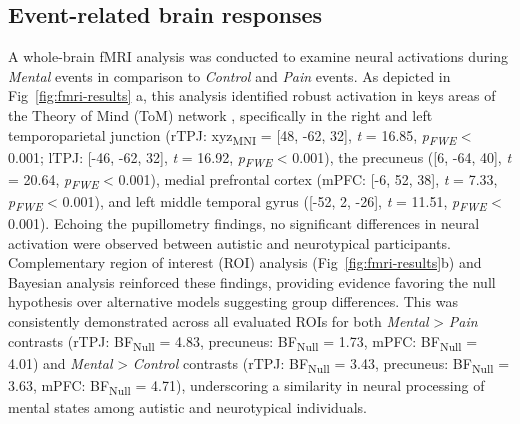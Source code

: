 \subsection{Event-related brain responses}
A whole-brain fMRI analysis was conducted to examine neural activations during \textit{Mental} events in comparison to \textit{Control} and \textit{Pain} events. As depicted in Fig~\ref{fig:fmri-results} a, this analysis identified robust activation in keys areas of the Theory of Mind (ToM) network \citep{schurz2014}, specifically in the right and left temporoparietal junction (rTPJ: xyz\textsubscript{MNI} = [48, -62, 32], \textit{t} = 16.85, \textit{p\textsubscript{FWE}} < 0.001; lTPJ: [-46, -62, 32], \textit{t} = 16.92, \textit{p\textsubscript{FWE}} < 0.001), the precuneus ([6, -64, 40], \textit{t} = 20.64, \textit{p\textsubscript{FWE}} < 0.001), medial prefrontal cortex (mPFC: [-6, 52, 38], \textit{t} = 7.33, \textit{p\textsubscript{FWE}} < 0.001), and left middle temporal gyrus ([-52, 2, -26], \textit{t} = 11.51, \textit{p\textsubscript{FWE}} < 0.001). Echoing the pupillometry findings, no significant differences in neural activation were observed between autistic and neurotypical participants. Complementary region of interest (ROI) analysis (Fig~\ref{fig:fmri-results}b) and Bayesian analysis reinforced these findings, providing evidence favoring the null hypothesis over alternative models suggesting group differences. This was consistently demonstrated across all evaluated ROIs for both \textit{Mental} > \textit{Pain} contrasts (rTPJ: BF\textsubscript{Null} = 4.83, precuneus: BF\textsubscript{Null} = 1.73, mPFC: BF\textsubscript{Null} = 4.01) and \textit{Mental} > \textit{Control} contrasts (rTPJ: BF\textsubscript{Null} = 3.43, precuneus: BF\textsubscript{Null} = 3.63,  mPFC: BF\textsubscript{Null} = 4.71), underscoring a similarity in neural processing of mental states among autistic and neurotypical individuals.



